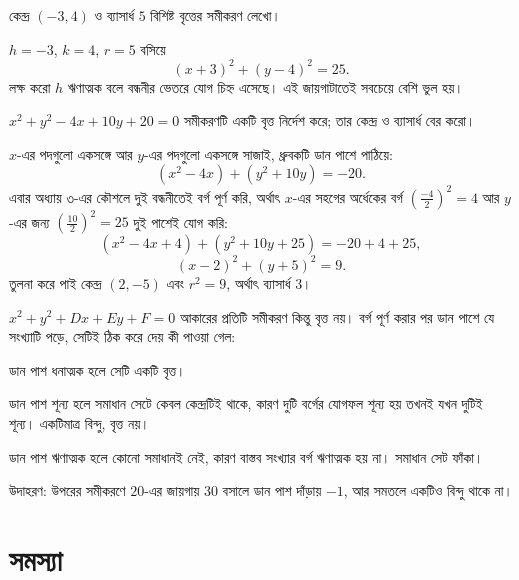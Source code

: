 \documentclass[11pt]{article}
\begin{document}
\begin{example}
কেন্দ্র $(-3, 4)$ ও ব্যাসার্ধ $5$ বিশিষ্ট বৃত্তের সমীকরণ লেখো।
\end{example}

\begin{solbox}
$h = -3$, $k = 4$, $r = 5$ বসিয়ে
\[
  (x + 3)^2 + (y - 4)^2 = 25 .
\]
লক্ষ করো $h$ ঋণাত্মক বলে বন্ধনীর ভেতরে যোগ চিহ্ন এসেছে। এই জায়গাটাতেই সবচেয়ে
বেশি ভুল হয়।
\end{solbox}

\begin{example}
$x^2 + y^2 - 4x + 10y + 20 = 0$ সমীকরণটি একটি বৃত্ত নির্দেশ করে; তার কেন্দ্র ও
ব্যাসার্ধ বের করো।
\end{example}

\begin{solbox}
$x$-এর পদগুলো একসঙ্গে আর $y$-এর পদগুলো একসঙ্গে সাজাই, ধ্রুবকটি ডান পাশে
পাঠিয়ে:
\[
  (x^2 - 4x) + (y^2 + 10y) = -20 .
\]
এবার অধ্যায় ৩-এর কৌশলে দুই বন্ধনীতেই বর্গ পূর্ণ করি, অর্থাৎ $x$-এর
সহগের অর্ধেকের বর্গ $\left(\tfrac{-4}{2}\right)^2 = 4$ আর $y$-এর জন্য
$\left(\tfrac{10}{2}\right)^2 = 25$ দুই পাশেই যোগ করি:
\[
  (x^2 - 4x + 4) + (y^2 + 10y + 25) = -20 + 4 + 25 ,
\]
\[
  (x - 2)^2 + (y + 5)^2 = 9 .
\]
তুলনা করে পাই কেন্দ্র $(2, -5)$ এবং $r^2 = 9$, অর্থাৎ ব্যাসার্ধ $3$।
\end{solbox}

\begin{remark}
$x^2 + y^2 + Dx + Ey + F = 0$ আকারের প্রতিটি সমীকরণ কিন্তু বৃত্ত নয়। বর্গ
পূর্ণ করার পর ডান পাশে যে সংখ্যাটি পড়ে, সেটিই ঠিক করে দেয় কী পাওয়া গেল:

ডান পাশ ধনাত্মক হলে সেটি একটি বৃত্ত।

ডান পাশ শূন্য হলে সমাধান সেটে কেবল কেন্দ্রটিই থাকে, কারণ দুটি বর্গের যোগফল
শূন্য হয় তখনই যখন দুটিই শূন্য। একটিমাত্র বিন্দু, বৃত্ত নয়।

ডান পাশ ঋণাত্মক হলে কোনো সমাধানই নেই, কারণ বাস্তব সংখ্যার বর্গ ঋণাত্মক হয় না।
সমাধান সেট ফাঁকা।

উদাহরণ: উপরের সমীকরণে $20$-এর জায়গায় $30$ বসালে ডান পাশ দাঁড়ায় $-1$, আর
সমতলে একটিও বিন্দু থাকে না।
\end{remark}

\section{সমস্যা}
\end{document}

